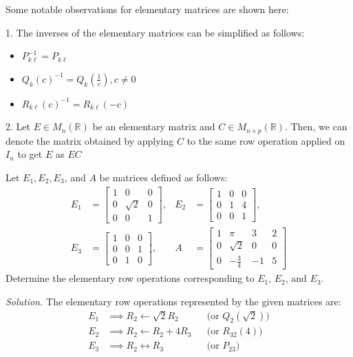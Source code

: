 \begin{remark}
Some notable observations for elementary matrices are shown here:

1. The inverses of the elementary matrices can be simplified as follows:
\begin{itemize}
    \item $P_{k\ell}^{-1} = P_{k\ell}$
    \item $\displaystyle Q_k(c)^{-1} = Q_k\left(\frac{1}{c}\right), c \neq 0$
    \item $R_{k\ell}(c)^{-1} = R_{k\ell}(-c)$
\end{itemize}

2. Let $E \in M_n(\mathbb{R})$ be an elementary matrix and $C \in M_{n \times p}(\mathbb{R})$. Then, we can denote the matrix obtained by applying $C$ to the same row operation applied on $I_n$ to get $E$ as $EC$

\end{remark}

\begin{example}\label{example:3.3}
Let $E_1, E_2, E_3$, and $A$ be matrices defined as follows:
\begin{align*}
E_1 &= \begin{bmatrix} 1 & 0 & 0 \\ 0 & \sqrt{2} & 0 \\ 0 & 0 & 1 \end{bmatrix}, &
E_2 &= \begin{bmatrix} 1 & 0 & 0 \\ 0 & 1 & 4 \\ 0 & 0 & 1 \end{bmatrix}, \\[1ex]
E_3 &= \begin{bmatrix} 1 & 0 & 0 \\ 0 & 0 & 1 \\ 0 & 1 & 0 \end{bmatrix}, &
A   &= \begin{bmatrix} 1 & \pi & 3 & 2 \\ 0 & \sqrt{2} & 0 & 0 \\ 0 & -\frac{3}{4} & -1 & 5 \end{bmatrix}
\end{align*}
Determine the elementary row operations corresponding to $E_1$, $E_2$, and $E_3$.

\textit{Solution.} The elementary row operations represented by the given matrices are:
\[
\begin{aligned}
E_1 &\implies R_2 \leftarrow \sqrt{2}R_2 && \text{(or $Q_2(\sqrt{2})$)} \\
E_2 &\implies R_2 \leftarrow R_2 + 4R_3 && \text{(or $R_{32}(4)$)} \\
E_3 &\implies R_2 \longleftrightarrow R_3 && \text{(or $P_{23}$)}
\end{aligned}
\]
\end{example}

